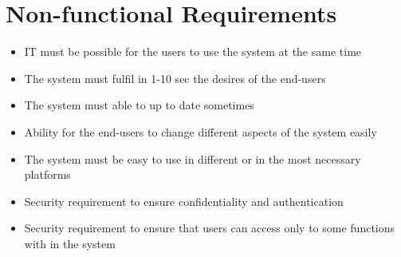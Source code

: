 \newpage
\section{Non-functional Requirements}

\begin{itemize}
	\item IT must be possible for the users to use the system at the same time 
	\item The system must fulfil in 1-10 sec the desires of the end-users
	\item The system must able to up to date sometimes
	\item Ability for the end-users to change different aspects of the system easily
	\item The system must be easy to use in different or in the most necessary platforms
	\item Security requirement to ensure confidentiality and authentication
	\item Security requirement to ensure that users can access only to some functions with in the system
\end{itemize}

